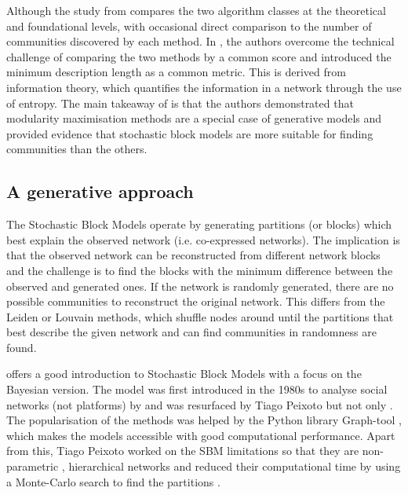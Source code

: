 Although the study from \citet{Peixoto2023-se} compares the two algorithm classes at the theoretical and foundational levels, with occasional direct comparison to the number of communities discovered by each method. In \citet{Peixoto2023-rt}, the authors overcome the technical challenge of comparing the two methods by a common score and introduced the minimum description length as a common metric. This is derived from information theory, which quantifies the information in a network through the use of entropy. The main takeaway of \citet{Peixoto2023-rt} is that the authors demonstrated that modularity maximisation methods are a special case of generative models and provided evidence that stochastic block models are more suitable for finding communities than the others.

\subsection{A generative approach} \label{s:lit:sbm}


The Stochastic Block Models operate by generating partitions (or blocks) which best explain the observed network (i.e. co-expressed networks). The implication is that the observed network can be reconstructed from different network blocks and the challenge is to find the blocks with the minimum difference between the observed and generated ones. If the network is randomly generated, there are no possible communities to reconstruct the original network. This differs from the Leiden or Louvain methods, which shuffle nodes around until the partitions that best describe the given network and can find communities in randomness are found. 

\citet{Peixoto2019-fg} offers a good introduction to Stochastic Block Models with a focus on the Bayesian version. The model was first introduced in the 1980s to analyse social networks (not platforms) by \citet{Holland1983-eu} and was resurfaced by Tiago Peixoto \citep{Peixoto2014-ls, Peixoto2017-gc, Peixoto2018-ot} but not only \citep{Karrer2011-si}. The popularisation of the methods was helped by the Python library Graph-tool \citep{Peixoto2014-ls}, which makes the models accessible with good computational performance. Apart from this, Tiago Peixoto worked on the SBM limitations so that they are non-parametric \citep{Peixoto2017-gc, Peixoto2018-ot}, hierarchical networks \citep{Peixoto2014-yb} and reduced their computational time by using a Monte-Carlo search to find the partitions \citep{Peixoto2014-ss}.

